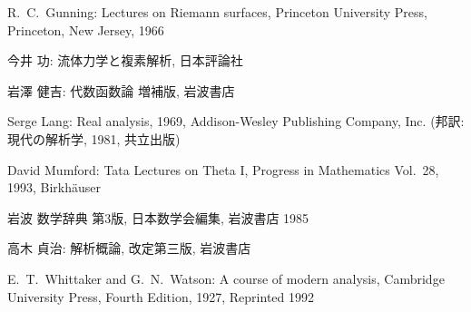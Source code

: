 \documentclass[12pt,twoside]{jarticle}
\begin{document}

\begin{thebibliography}{ABC}


R.~C.~Gunning: Lectures on Riemann surfaces, Princeton University
Press, Princeton, New Jersey, 1966





今井 功: 流体力学と複素解析, 日本評論社

岩澤 健吉: 代数函数論 増補版, 岩波書店

Serge Lang: Real analysis, 1969, Addison-Wesley Publishing Company,
Inc. (邦訳: 現代の解析学, 1981, 共立出版)



David Mumford: Tata Lectures on Theta I,
Progress in Mathematics Vol.~28, 1993, Birkh\"auser


岩波 数学辞典 第3版, 日本数学会編集, 岩波書店 1985

高木 貞治: 解析概論, 改定第三版, 岩波書店


E.~T.~Whittaker and G.~N.~Watson: A course of modern analysis,
Cambridge University Press, Fourth Edition, 1927, Reprinted 1992

\end{thebibliography}

\end{document}
